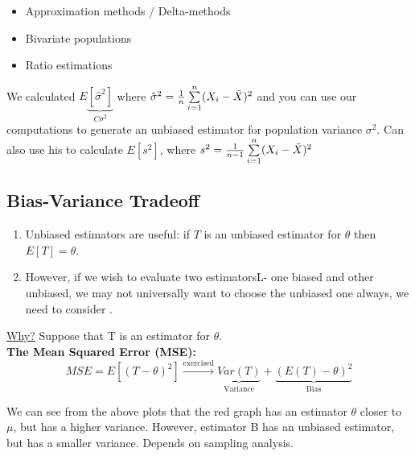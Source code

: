 \begin{itemize}
	\item Approximation methods / Delta-methods
	\item Bivariate populations
	\item Ratio estimations
\end{itemize}
We calculated $E\underbrace{[\hat{\sigma}^2]}_{C\sigma^2}$ where $\hat{\sigma}^2 = \frac{1}{n} \sum\limits_{i=1}^n (X_i - \bar{X})^2$ and you can use our computations to generate an unbiased estimator for population variance $\sigma^2$. Can also use his to calculate $E[s^2]$, where $s^2 = \frac{1}{n-1} \sum\limits_{i=1}^n (X_i - \bar{X})^2$
\subsection*{Bias-Variance Tradeoff}
\begin{enumerate}[label=\protect\circled{\arabic*}]
	\item Unbiased estimators are useful: if $T$ is an unbiased estimator for $\theta$ then $E[T] = \theta$.
	\item However, if we wish to evaluate two estimatorsL- one biased and other unbiased, we may not universally want to choose the unbiased one always, we need to consider .
\end{enumerate}
\underline{Why?} Suppose that T is an estimator for $\theta$.\\
\textbf{The Mean Squared Error (MSE):}
\begin{equation*}
	MSE = E[(T - \theta)^2] \xrightarrow{\text{exercised}} \underbrace{Var(T)}_{\text{Variance}} + \underbrace{(E(T) - \theta)^2}_{\text{Bias}}
\end{equation*}
\begin{center}
\end{center}
We can see from the above plots that the red graph has an estimator $\theta$ closer to $\mu$, but has a higher variance. However, estimator B has an unbiased estimator, but has a smaller variance. Depends on sampling analysis.

